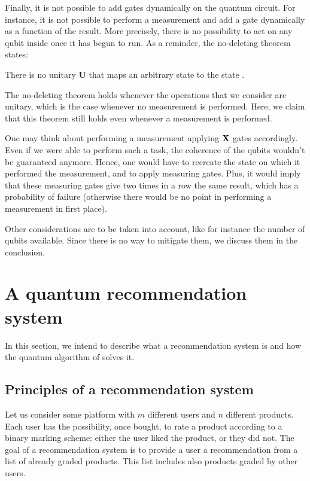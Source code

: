 \documentclass[11pt, a4paper]{article}
\begin{document}
            Finally, it is not possible to add gates dynamically on the quantum circuit. For instance, it is not possible to perform a measurement and add a gate dynamically as a function of the result. More precisely, there is no possibility to act on any qubit inside once it has begun to run. As a reminder, the no-deleting theorem states:
            
            \begin{theorem}
                There is no unitary \(\mathbf{U}\) that maps an arbitrary state \ket{\psi} to the state .
            \end{theorem}
            
            The no-deleting theorem holds whenever the operations that we consider are unitary, which is the case whenever no measurement is performed. Here, we claim that this theorem still holds even whenever a measurement is performed.
            
            One may think about performing a measurement applying \(\mathbf{X}\) gates accordingly. Even if we were able to perform such a task, the coherence of the qubits wouldn't be guaranteed anymore. Hence, one would have to recreate the state on which it performed the measurement, and to apply measuring gates. Plus, it would imply that these measuring gates give two times in a row the same result, which has a probability of failure (otherwise there would be no point in performing a measurement in first place).
            
            Other considerations are to be taken into account, like for instance the number of qubits available. Since there is no way to mitigate them, we discuss them in the conclusion.
    \section{A quantum recommendation system}
        \label{sec:QRS}
        In this section, we intend to describe what a recommendation system is and how the quantum algorithm of \citeauthor{QRS} solves it.
        \subsection{Principles of a recommendation system}
            Let us consider some platform with \(m\) different users and \(n\) different products. Each user has the possibility, once bought, to rate a product according to a binary marking scheme: either the user liked the product, or they did not. The goal of a recommendation system is to provide a user a recommendation from a list of already graded products. This list includes also products graded by other users.
            
\end{document}
